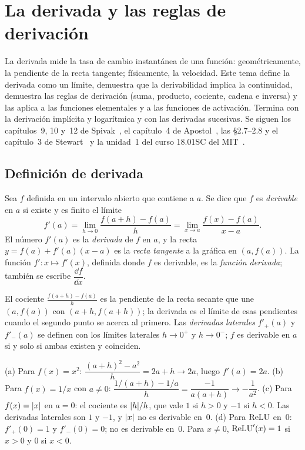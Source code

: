 \chapter{La derivada y las reglas de derivación}
\label{tema:4}

La derivada mide la tasa de cambio instantánea de una función: geométricamente, la pendiente de la recta tangente; físicamente, la velocidad. Este tema define la derivada como un límite, demuestra que la derivabilidad implica la continuidad, demuestra las reglas de derivación (suma, producto, cociente, cadena e inversa) y las aplica a las funciones elementales y a las funciones de activación. Termina con la derivación implícita y logarítmica y con las derivadas sucesivas. Se siguen los capítulos~9, 10 y~12 de Spivak~\cite{spivak}, el capítulo~4 de Apostol~\cite{apostol}, las §2.7--2.8 y el capítulo~3 de Stewart~\cite{stewart} y la unidad~1 del curso 18.01SC del MIT~\cite{mit1801}.

\section{Definición de derivada}

\begin{definicion}[Derivada]\label{def:derivada}
Sea $f$ definida en un intervalo abierto que contiene a $a$. Se dice que $f$ es \emph{derivable} en $a$ si existe y es finito el límite
\[
f'(a)=\lim_{h\to0}\frac{f(a+h)-f(a)}{h}=\lim_{x\to a}\frac{f(x)-f(a)}{x-a}.
\]
El número $f'(a)$ es la \emph{derivada} de $f$ en $a$, y la recta $y=f(a)+f'(a)(x-a)$ es la \emph{recta tangente} a la gráfica en $(a,f(a))$. La función $f'\colon x\mapsto f'(x)$, definida donde $f$ es derivable, es la \emph{función derivada}; también se escribe $\dfrac{\dd f}{\dd x}$.
\end{definicion}

El cociente $\frac{f(a+h)-f(a)}{h}$ es la pendiente de la recta secante que une $(a,f(a))$ con $(a+h,f(a+h))$; la derivada es el límite de esas pendientes cuando el segundo punto se acerca al primero. Las \emph{derivadas laterales} $f'_{+}(a)$ y $f'_{-}(a)$ se definen con los límites laterales $h\to0^{+}$ y $h\to0^{-}$; $f$ es derivable en $a$ si y solo si ambas existen y coinciden.

\begin{ejemplo}\label{ej:def-derivada}
(a) Para $f(x)=x^{2}$: $\dfrac{(a+h)^{2}-a^{2}}{h}=2a+h\to2a$, luego $f'(a)=2a$.
(b) Para $f(x)=1/x$ con $a\ne0$: $\dfrac{1/(a+h)-1/a}{h}=\dfrac{-1}{a(a+h)}\to-\dfrac{1}{a^{2}}$.
(c) Para $f(x)=\lvert x\rvert$ en $a=0$: el cociente es $\lvert h\rvert/h$, que vale $1$ si $h>0$ y $-1$ si $h<0$. Las derivadas laterales son $1$ y $-1$, y $\lvert x\rvert$ no es derivable en~0.
(d) Para $\operatorname{ReLU}$ en~0: $f'_{+}(0)=1$ y $f'_{-}(0)=0$; no es derivable en~0. Para $x\ne0$, $\operatorname{ReLU}'(x)=1$ si $x>0$ y $0$ si $x<0$.
\end{ejemplo}

